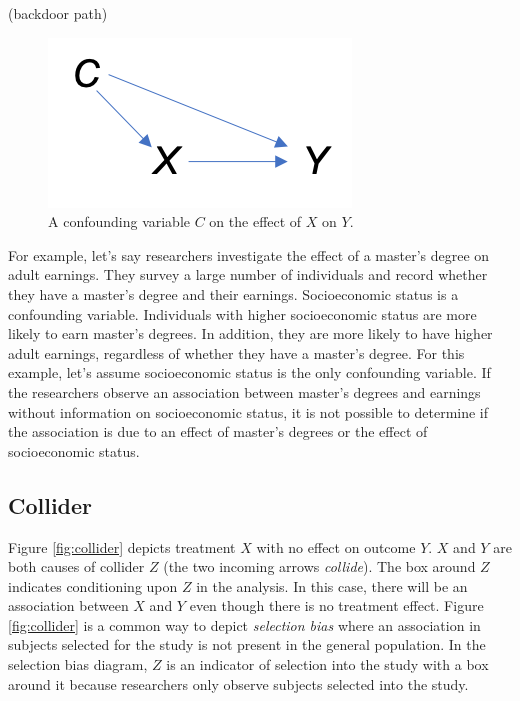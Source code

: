 \documentclass[
]{book}
\begin{document}
(backdoor path)

\begin{figure}
\centering
\includegraphics{./images/confounder.png}
\caption{\label{fig:confounder} A confounding variable \(C\) on the effect of \(X\) on \(Y\).}
\end{figure}

For example, let's say researchers investigate the effect of a master's degree on adult earnings. They survey a large number of individuals and record whether they have a master's degree and their earnings. Socioeconomic status is a confounding variable. Individuals with higher socioeconomic status are more likely to earn master's degrees. In addition, they are more likely to have higher adult earnings, regardless of whether they have a master's degree. For this example, let's assume socioeconomic status is the only confounding variable. If the researchers observe an association between master's degrees and earnings without information on socioeconomic status, it is not possible to determine if the association is due to an effect of master's degrees or the effect of socioeconomic status.

\hypertarget{collider}{%
\subsection{Collider}\label{collider}}

Figure \ref{fig:collider} depicts treatment \(X\) with no effect on outcome \(Y\). \(X\) and \(Y\) are both causes of collider \(Z\) (the two incoming arrows \emph{collide}). The box around \(Z\) indicates conditioning upon \(Z\) in the analysis. In this case, there will be an association between \(X\) and \(Y\) even though there is no treatment effect. Figure \ref{fig:collider} is a common way to depict \emph{selection bias} where an association in subjects selected for the study is not present in the general population. In the selection bias diagram, \(Z\) is an indicator of selection into the study with a box around it because researchers only observe subjects selected into the study.
\end{document}

